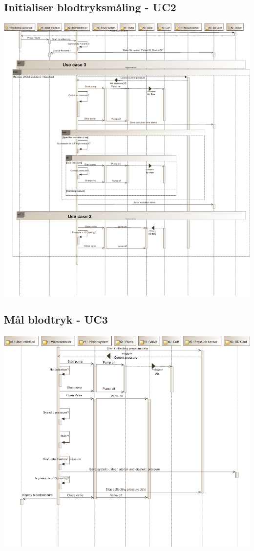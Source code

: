 \subsection{Initialiser blodtryksmåling - UC2}
\includegraphics[width=\textwidth]{pdfs/SD_UC2-crop.pdf}

\subsection{Mål blodtryk - UC3}
\includegraphics[width=\textwidth]{pdfs/SD_UC3-crop.pdf}

